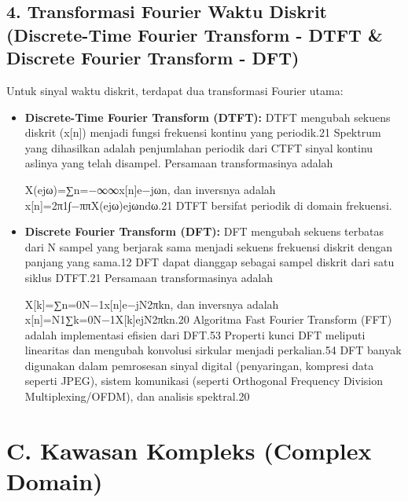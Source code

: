 \documentclass[
  letterpaper,
  DIV=11,
  numbers=noendperiod]{scrreprt}
\begin{document}
\subsection{4. Transformasi Fourier Waktu Diskrit (Discrete-Time Fourier
Transform - DTFT \& Discrete Fourier Transform -
DFT)}\label{transformasi-fourier-waktu-diskrit-discrete-time-fourier-transform---dtft-discrete-fourier-transform---dft}

Untuk sinyal waktu diskrit, terdapat dua transformasi Fourier utama:

\begin{itemize}
\item
  \textbf{Discrete-Time Fourier Transform (DTFT):} DTFT mengubah sekuens
  diskrit (x{[}n{]}) menjadi fungsi frekuensi kontinu yang periodik.21
  Spektrum yang dihasilkan adalah penjumlahan periodik dari CTFT sinyal
  kontinu aslinya yang telah disampel. Persamaan transformasinya adalah

  X(ejω)=∑n=−∞∞\hspace{0pt}x{[}n{]}e−jωn, dan inversnya adalah
  x{[}n{]}=2π1\hspace{0pt}∫−ππ\hspace{0pt}X(ejω)ejωndω.21 DTFT bersifat
  periodik di domain frekuensi.
\item
  \textbf{Discrete Fourier Transform (DFT):} DFT mengubah sekuens
  terbatas dari N sampel yang berjarak sama menjadi sekuens frekuensi
  diskrit dengan panjang yang sama.12 DFT dapat dianggap sebagai sampel
  diskrit dari satu siklus DTFT.21 Persamaan transformasinya adalah

  X{[}k{]}=∑n=0N−1\hspace{0pt}x{[}n{]}e−jN2π\hspace{0pt}kn, dan
  inversnya adalah
  x{[}n{]}=N1\hspace{0pt}∑k=0N−1\hspace{0pt}X{[}k{]}ejN2π\hspace{0pt}kn.20
  Algoritma Fast Fourier Transform (FFT) adalah implementasi efisien
  dari DFT.53 Properti kunci DFT meliputi linearitas dan mengubah
  konvolusi sirkular menjadi perkalian.54 DFT banyak digunakan dalam
  pemrosesan sinyal digital (penyaringan, kompresi data seperti JPEG),
  sistem komunikasi (seperti Orthogonal Frequency Division
  Multiplexing/OFDM), dan analisis spektral.20
\end{itemize}

\section{C. Kawasan Kompleks (Complex
Domain)}\label{c.-kawasan-kompleks-complex-domain}
\end{document}
